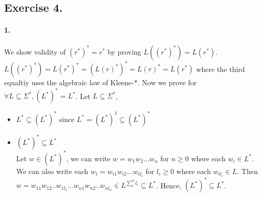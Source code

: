 \documentclass[12pt]{article}
\begin{document}
\subsection*{Exercise 4.}
\paragraph*{1.} We show validity of \((r^*)^* = r^*\) by proving \(L((r^*)^*) = L(r^*)\).\\
\(L((r^*)^*) = L(r^*)^* = (L(r)^*)^* = L(r)^* = L(r^*)\) where the third equaltiy uses the algebraic law of Kleene-*. Now we prove for \(\forall L \subseteq \Sigma^*, (L^*)^* = L^*\). Let \(L \subseteq \Sigma^*\),
\begin{itemize}
  \item \(L^* \subseteq (L^*)^*\) since \(L^* = (L^*)^1 \subseteq (L^*)^*\)
  \item \((L^*)^* \subseteq L^*\)\\
  Let \(w \in (L^*)^*\), we can write \(w = w_1w_2...w_n\) for \(n \geq 0\) where each \(w_i \in L^*\). We can also write each \(w_i = w_{i1}w_{i2}...w_{il_i}\) for \(l_i \geq 0\) where each \(w_{il_i} \in L\). Then \(w = w_{11}w_{12}..w_{1l_1}...w_{n1}w_{n2}..w_{nl_n} \in L^{\sum_1^n{l_i}} \subseteq L^*\). Hence, \((L^*)^* \subseteq L^*\). 
\end{itemize}
\end{document}
